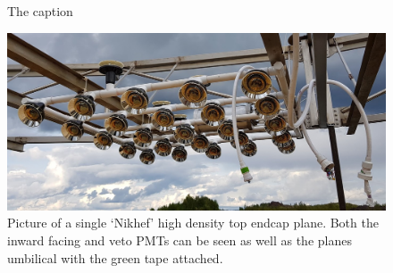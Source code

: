 \begin{figure} %
    \centering
    \quad
    \caption[The caption]
    {The caption}
\end{figure}

\begin{figure} %
    \includegraphics[width=\textwidth]{diagrams/4-chips/single_plane.jpg}
    \caption[Picture of a single `Nikhef' plane.]
    {Picture of a single `Nikhef' high density top endcap plane. Both the inward facing and veto
        PMTs can be seen as well as the planes umbilical with the green tape attached.}
    \label{fig:single_plane}
\end{figure}


